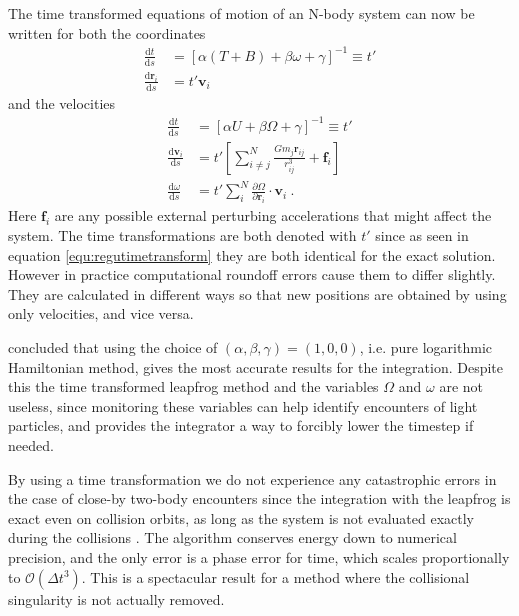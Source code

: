 \documentclass[english, oneside]{HYgradu}
\begin{document}
The time transformed equations of motion of an N-body system can now be written for both the coordinates
\begin{equation}
\begin{aligned}
\frac{\mathrm{d}t}{\mathrm{d}s} &= [\alpha (T + B) + \beta \omega + \gamma]^{-1} \equiv t' \\
\frac{\mathrm{d}\boldsymbol{r}_i}{\mathrm{d}s} &= t' \boldsymbol{v}_i
\end{aligned} \label{equ:tteompositions}
\end{equation}
and the velocities
\begin{equation}
\begin{aligned}
\frac{\mathrm{d}t}{\mathrm{d}s} &= [\alpha U + \beta \Omega + \gamma]^{-1} \equiv t' \\
\frac{\mathrm{d}\boldsymbol{v}_i}{\mathrm{d}s} &= t' \left[ \sum_{i \neq j}^N \frac{G m_j \boldsymbol{r}_{ij}}{r_{ij}^3} + \boldsymbol{f}_i \right] \\
\frac{\mathrm{d} \omega}{\mathrm{d}s} &= t' \sum_i^N \frac{\partial \Omega}{\partial \boldsymbol{r}_i} \cdot \boldsymbol{v}_i \ .
\end{aligned} \label{equ:tteomvelocities}
\end{equation}
Here $\boldsymbol{f}_i$ are any possible external perturbing accelerations that might affect the system. The time transformations are both denoted with $t'$ since as seen in equation \eqref{equ:regutimetransform} they are both identical for the exact solution. However in practice computational roundoff errors cause them to differ slightly. They are calculated in different ways so that new positions are obtained by using only velocities, and vice versa.

\cite{mikkola:2008b} concluded that using the choice of $(\alpha, \beta, \gamma) = (1,0,0)$, i.e. pure logarithmic Hamiltonian method, gives the most accurate results for the integration. Despite this the time transformed leapfrog method and the variables $\Omega$ and $\omega$ are not useless, since monitoring these variables can help identify encounters of light particles, and provides the integrator a way to forcibly lower the timestep if needed.

By using a time transformation we do not experience any catastrophic errors in the case of close-by two-body encounters since the integration with the leapfrog is exact even on collision orbits, as long as the system is not evaluated exactly during the collisions \citep{mikkola:1999}. The algorithm conserves energy down to numerical precision, and the only error is a phase error for time, which scales proportionally to $\mathcal{O}(\Delta t^3)$. This is a spectacular result for a method where the collisional singularity is not actually removed.
\end{document}
